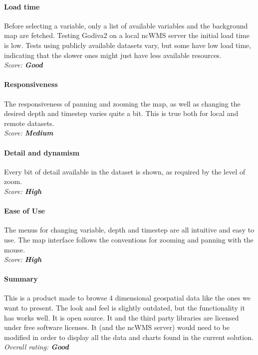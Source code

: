 \documentclass[11pt,a4paper,titlepage,oneside]{report}
\begin{document}
	\paragraph{Load time}
	Before selecting a variable, only a list of available variables and the background map are fetched. Testing Godiva2 on a local ncWMS server the initial load time is low. Tests using publicly available datasets vary, but some have low load time, indicating that the slower ones might just have less available resources.
   \\ \emph{Score: \textbf{Good}}
	
	\paragraph{Responsiveness}
	The responsiveness of panning and zooming the map, as well as changing the desired depth and timestep varies quite a bit. This is true both for local and remote datasets.
   \\ \emph{Score: \textbf{Medium}}
	
	\paragraph{Detail and dynamism}
	Every bit of detail available in the dataset is shown, as required by the level of zoom.
   \\ \emph{Score: \textbf{High}}
	
	\paragraph{Ease of Use}
	The menus for changing variable, depth and timestep are all intuitive and easy to use. The map interface follows the conventions for zooming and panning with the mouse.
   \\ \emph{Score: \textbf{High}}
	
	\paragraph{Summary}
	This is a product made to browse 4 dimensional geospatial data like the ones we want to present. The look and feel is slightly outdated, but the functionality it has works well. It is \gls{open source}. It and the third party libraries are licensed under free software licenses. It (and the ncWMS server) would need to be modified in order to display all the data and charts found in the current solution.
   \\ \emph{Overall rating: \textbf{Good}}
	
\end{document}
